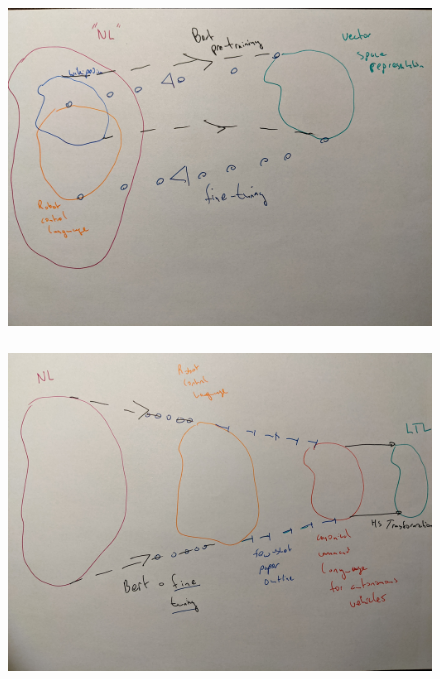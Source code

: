 \documentclass{beamer}
\begin{document}
\begin{frame}
\frametitle{}
\begin{figure}
\hspace*{-3mm}%
   \includegraphics[width= \paperwidth]{pics/two.jpg}
\end{figure}
\end{frame}


\begin{frame}
\frametitle{}
\begin{figure}
\hspace*{-3mm}%
   \includegraphics[width= \paperwidth]{pics/three.jpg}
\end{figure}
\end{frame}
\end{document}
